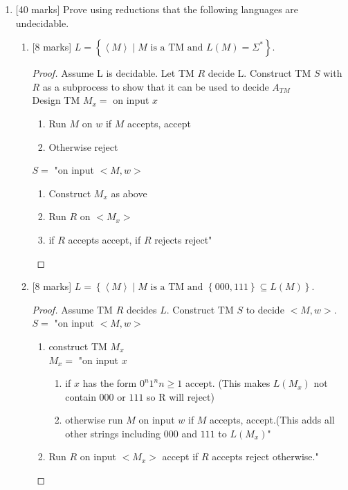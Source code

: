 \documentclass{article}
\newcommand{\set}[1]{{\left\{#1\right\}}}    %
\newcommand{\enc}[1]{\left<#1\right>}
\begin{document}
\begin{enumerate}
\begin{enumerate}
        \end{enumerate}
    \item {[40 marks]} Prove using reductions that the following languages are undecidable.

    \begin{enumerate}


    	\item {[8 marks]} $L=\set{\enc{M}\mid M\text{ is a TM and }L(M)=\Sigma^*}$.  
    	\begin{proof}
    	Assume L is decidable. 
    	Let TM $R$ decide L. Construct TM $S$ with $R$ as a subprocess to show that it can be used to decide $A_{TM}$\\
    	Design TM $M_x =$ on input $x$
    	\begin{enumerate}
    		\item Run $M$ on $w$ if $M$ accepts, accept
    		\item Otherwise reject
    	\end{enumerate}
    	$S = $ "on input $<M, w>$ 
    	\begin{enumerate}
    		\item Construct $M_x$ as above
    		\item Run $R$ on $<M_x>$
    		\item if $R$ accepts accept, if $R$ rejects reject"
    	\end{enumerate}
    	\end{proof}


        \item {[8 marks]} $L=\set{\enc{M}\mid M\text{ is a TM and }\set{000,111}\subseteq L(M)}$.
        \begin{proof}
        Assume TM $R$ decides $L$. Construct TM $S$ to decide $<M, w>$.\\
        $S =$ "on input $<M, w>$
        	\begin{enumerate}
        		\item construct TM $M_x$\\
        			$M_x =$ "on input $x$
        				\begin{enumerate}
        				\item if $x$ has the form $0^n1^n n\geq 1$ accept. (This makes $L(M_x)$ not contain $000$ or $111$ so R will reject)
        				\item otherwise run $M$ on input $w$ if $M$ accepts, accept.(This adds all other strings including $000$ and $111$ to $L(M_x)$"
        				\end{enumerate}
        		\item Run $R$ on input $<M_x>$ accept if $R$ accepts reject otherwise."
        	\end{enumerate}
        \end{proof}



\end{enumerate}
\end{enumerate}
\end{document}
